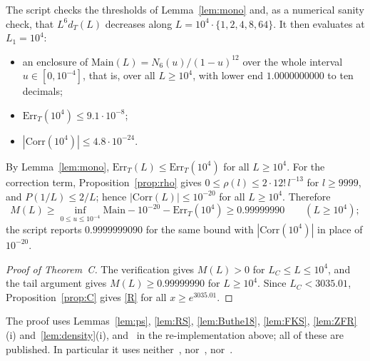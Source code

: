 \documentclass{amsart}
\theoremstyle{definition}
\theoremstyle{remark}
\theoremstyle{plain}
\numberwithin{equation}{section}
\newcommand{\Main}{\mathrm{Main}}
\newcommand{\Corr}{\mathrm{Corr}}
\newcommand{\Err}{\mathrm{Err}}
\begin{document}
The script checks the thresholds of Lemma~\ref{lem:mono} and, as a numerical sanity check, that $L^6d_T(L)$ decreases along $L=10^4\cdot\{1,2,4,8,64\}$. It then evaluates at $L_1=10^4$:
\begin{itemize}
\item an enclosure of $\Main(L)=N_6(u)/(1-u)^{12}$ over the whole interval $u\in[0,10^{-4}]$, that is, over all $L\ge10^4$, with lower end $1.0000000000$ to ten decimals;
\item $\Err_T(10^4)\le9.1\cdot10^{-8}$;
\item $|\Corr(10^4)|\le4.8\cdot10^{-24}$.
\end{itemize}
By Lemma~\ref{lem:mono}, $\Err_T(L)\le\Err_T(10^4)$ for all $L\ge10^4$. For the correction term, Proposition~\ref{prop:rho} gives $0\le\rho(l)\le2\cdot12!\,l^{-13}$ for $l\ge9999$, and $P(1/L)\le2/L$; hence $|\Corr(L)|\le10^{-20}$ for all $L\ge10^4$. Therefore
\[
M(L)\ge\inf_{0\le u\le10^{-4}}\Main-10^{-20}-\Err_T(10^4)\ge0.99999990\qquad(L\ge10^4);
\]
the script reports $0.9999999090$ for the same bound with $|\Corr(10^4)|$ in place of $10^{-20}$.

\begin{proof}[Proof of Theorem~C]
The verification gives $M(L)>0$ for $L_C\le L\le10^4$, and the tail argument gives $M(L)\ge0.99999990$ for $L\ge10^4$. Since $L_C<3035.01$, Proposition~\ref{prop:C} gives \eqref{R} for all $x\ge e^{3035.01}$.
\end{proof}

The proof uses Lemmas~\ref{lem:ps}, \ref{lem:RS}, \ref{lem:Buthe18}, \ref{lem:FKS}, \ref{lem:ZFR}(i) and~\ref{lem:density}(i), and~\cite[Thm.~1.1]{FKS23} in the re-implementation above; all of these are published. In particular it uses neither~\cite[Lemma~2.1]{DP15}, nor~\cite[Thm.~1]{But16}, nor~\cite{CH25}.
\end{document}
